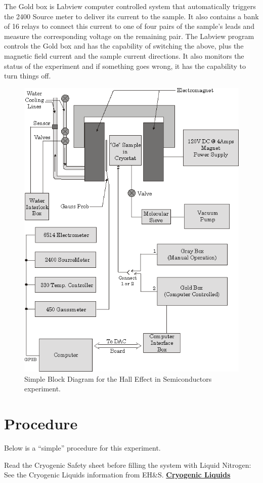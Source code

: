 \documentclass{../lab}
\newcommand{\CryogenicLiquids}{http://experimentationlab.berkeley.edu/sites/default/files/images/77cryogenic.pdf}
\begin{document}
The Gold box is Labview computer controlled system that automatically triggers the 2400 Source meter to deliver its current to the sample. It also contains a bank of 16 relays to connect this current to one of four pairs of the sample's leads and measure the corresponding voltage on the remaining pair. The Labview program controls the Gold box and has the capability of switching the above, plus the magnetic field current and the sample current directions. It also monitors the status of the experiment and if something goes wrong, it has the capability to turn things off.

\begin{figure}
    \centering
    \includegraphics[width=0.8\linewidth]{images/BlockDiagram.png}
    \caption{Simple Block Diagram for the Hall Effect in Semiconductors experiment.}
    \label{fig:BlockDiagram}
\end{figure}

\section{Procedure}

Below is a ``simple'' procedure for this experiment.

Read the Cryogenic Safety sheet before filling the system with Liquid Nitrogen: See the Cryogenic Liquids information from EH\&S. \href{\CryogenicLiquids}{\textbf{Cryogenic Liquids}}
\end{document}

